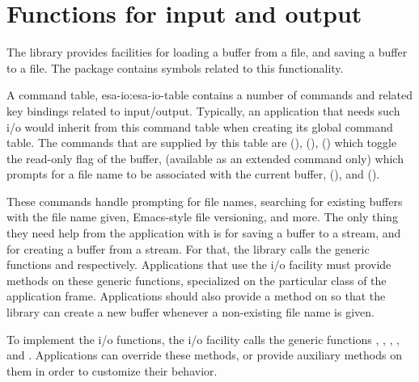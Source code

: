 \chapter{Functions for input and output}

The \sysname{} library provides facilities for loading a buffer from a
file, and saving a buffer to a file.  The  package
contains symbols related to this functionality.

A command table, esa-io:esa-io-table contains a number of commands and
related key bindings related to input/output.  Typically, an
application that needs such i/o would inherit from this command table
when creating its global command table.  The commands that are
supplied by this table are  (),
 (),
 () which toggle the read-only
flag of the buffer,  (available as
an extended command only) which prompts for a file name to be
associated with the current buffer, 
(), and  ().

These commands handle prompting for file names, searching for existing
buffers with the file name given, Emacs-style file versioning, and
more.  The only thing they need help from the application with is for
saving a buffer to a stream, and for creating a buffer from a stream.
For that, the \sysname{} library calls the generic functions
 and
 respectively.
Applications that use the \sysname{} i/o facility must provide methods
on these generic functions, specialized on the particular class of the
application frame.  Applications should also provide a method on
 so that the \sysname{}
library can create a new buffer whenever a non-existing file name is
given.

To implement the i/o functions, the \sysname{} i/o facility calls the
generic functions ,
,
,
, and
.  Applications can override these
methods, or provide auxiliary methods on them in order to customize
their behavior.
